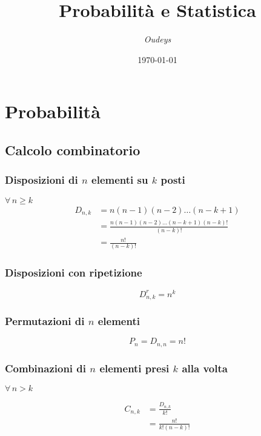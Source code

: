 \documentclass[a4paper,12pt]{article}
\title{\textbf{Probabilità e Statistica}}
\author{\textit{Oudeys}}
\date{\today}
\theoremstyle{mystyle}
\begin{document}
\maketitle



\tableofcontents
\newpage

\section{Probabilità}

\subsection{Calcolo combinatorio}
\subsubsection{\texorpdfstring{Disposizioni di \(n\) elementi su \(k\) posti}{Disposizioni di n elementi su k posti}}
\(\forall \, n \geq k\)
\[
    \begin{aligned}
        D_{n,k} 
        &= n(n-1)(n-2) \ldots (n-k+1) \\
        &= \frac{n(n-1)(n-2) \ldots (n-k+1)(n-k)!}{(n-k)!} \\
        &= \frac{n!}{(n-k)!}
    \end{aligned}
\]

\subsubsection{Disposizioni con ripetizione}

\[
    D_{n,k}^r = n^k    
\]

\subsubsection{\texorpdfstring{Permutazioni di \(n\) elementi}{Permutazioni di n elementi}}
\[
    P_n = D_{n,n} = n!
\]

\subsubsection{\texorpdfstring{Combinazioni di \(n\) elementi presi \(k\) alla volta}{Combinazioni di n elementi presi k alla volta}}
\(\forall \, n>k\)

\[
    \begin{aligned}
        C_{n,k}
        & = \frac{D_{n,k}}{k!} \\
        & = \frac{n!}{k!(n-k)!}
    \end{aligned}
\]
\end{document}
